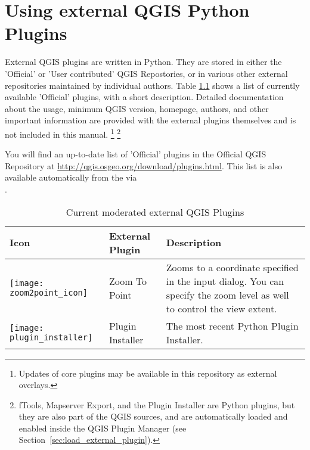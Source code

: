 
\chapter{Using external QGIS Python Plugins}\label{sec:external_plugins}


External QGIS plugins are written in Python. They are stored in either
the 'Official' or 'User contributed' QGIS Repostories, or in various other external
repositories maintained by individual authors.
Table \ref{tab:external_plugins} shows a list of currently available 'Official'
plugins, with a short description.
Detailed documentation about the usage, minimum QGIS version, homepage, authors,
and other important information are provided with the external plugins themselves
and is not included in this manual.
\footnote{Updates of core plugins may be
available in this repository as external overlays.}
\footnote{fTools, Mapserver Export, and the Plugin Installer are Python plugins,
but they are also part of the QGIS sources, and are automatically loaded and
enabled inside the QGIS Plugin Manager (see Section~\ref{sec:load_external_plugin}).}


You will find an up-to-date list of 'Official' plugins in the Official QGIS
Repository at \url{http://qgis.osgeo.org/download/plugins.html}. This list is
also available automatically from the 
via \\
.

\begin{table}[H]
\centering
 \begin{tabular}{|l|l|p{8cm}|}
\hline \textbf{Icon} & \textbf{External Plugin} & \textbf{Description}\\
\hline
\texttt{[image: zoom2point\_icon]}
 & Zoom To Point \index{plugins!Zoom To Point} & Zooms to a coordinate
  specified in the input dialog. You can specify the zoom level as well to
  control the view extent.\\
\hline
\texttt{[image: plugin\_installer]}
 & Plugin Installer \index{plugins!Plugin Installer} & The most recent Python Plugin Installer.\\
\hline
\end{tabular}
\caption{Current moderated external QGIS Plugins}\label{tab:external_plugins}
\end{table}

